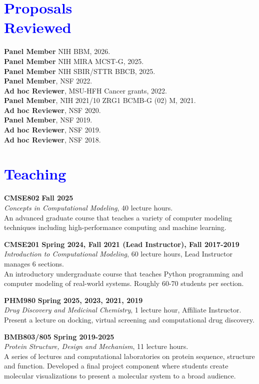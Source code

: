 \documentclass[margin,line]{res}
\begin{document}
\begin{resume}
\section{\sc \textcolor{blue}{ Proposals \\ Reviewed}}
        {\bf Panel Member} NIH \hfill BBM, 2026. \\
        {\bf Panel Member} NIH \hfill MIRA MCST-G, 2025.\\
{\bf Panel Member} NIH \hfill SBIR/STTR BBCB, 2025. \\
{\bf Panel Member}, NSF \hfill 2022.\\
{\bf Ad hoc Reviewer}, MSU-HFH \hfill Cancer grants, 2022. \\
{\bf Panel Member}, NIH \hfill 2021/10 ZRG1 BCMB-G (02) M, 2021. \\
{\bf Ad hoc Reviewer}, NSF \hfill 2020. \\
{\bf Panel Member}, NSF \hfill 2019.\\
{\bf Ad hoc Reviewer}, NSF \hfill 2019. \\
{\bf Ad hoc Reviewer}, NSF \hfill 2018. \\

\section{\sc \textcolor{blue}{ Teaching }}
{\bf CMSE802} \hfill {\bf Fall 2025} \\
\emph{Concepts in Computational Modeling}, 40 lecture hours.\\
An advanced graduate course that teaches a variety of computer modeling techniques including high-performance computing and machine learning.

{\bf CMSE201} \hfill {\bf Spring 2024, Fall 2021 (Lead Instructor), Fall 2017-2019} \\
\emph{Introduction to Computational Modeling}, 60 lecture hours, Lead Instructor manages 6 sections.\\
An introductory undergraduate course that teaches Python programming and computer modeling of real-world systems. Roughly 60-70 students per section.

{\bf PHM980} \hfill {\bf Spring 2025, 2023, 2021, 2019} \\
\emph{Drug Discovery and Medicinal Chemistry}, 1 lecture hour, Affiliate Instructor.\\
Present a lecture on docking, virtual screening and computational drug discovery.

{\bf BMB803/805} \hfill {\bf Spring 2019-2025} \\
\emph{Protein Structure, Design and Mechanism}, 11 lecture hours.\\
A series of lectures and computational laboratories on protein sequence, structure and function.  Developed a final project component where students create molecular visualizations to present a molecular system to a broad audience.


\end{resume}
\end{document}
